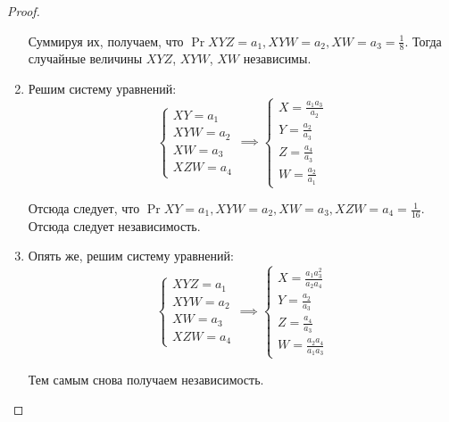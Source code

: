 \begin{proof}
\begin{enumerate}
        Суммируя их, получаем, что \(\Pr{XYZ = a_1, XYW = a_2, XW = a_3} = \frac{1}{8}.\) Тогда случайные величины \(XYZ\), \(XYW\), \(XW\) независимы.
        
        \item Решим систему уравнений:
        \[\begin{cases}
        XY = a_1 \\ XYW = a_2 \\ XW = a_3 \\ XZW = a_4
        \end{cases}
        \implies
        \begin{cases}
        X = \frac{a_1 a_3}{a_2} \\ Y = \frac{a_2}{a_3} \\ Z = \frac{a_4}{a_3} \\ W = \frac{a_2}{a_1}
        \end{cases}
        \]
        
        Отсюда следует, что \(\Pr{XY = a_1, XYW = a_2, XW = a_3, XZW = a_4} = \frac{1}{16}\). Отсюда следует независимость.
        
        \item Опять же, решим систему уравнений:
        \[
        \begin{cases}
        XYZ = a_1 \\ XYW = a_2 \\ XW = a_3 \\ XZW = a_4
        \end{cases}
        \implies
        \begin{cases}
        X = \frac{a_1a_3^2}{a_2a_4} \\ Y = \frac{a_2}{a_3} \\ Z = \frac{a_4}{a_3} \\ W = \frac{a_2a_4}{a_1a_3}
        \end{cases}
        \]
        
        Тем самым снова получаем независимость.
    \end{enumerate}
\end{proof}

